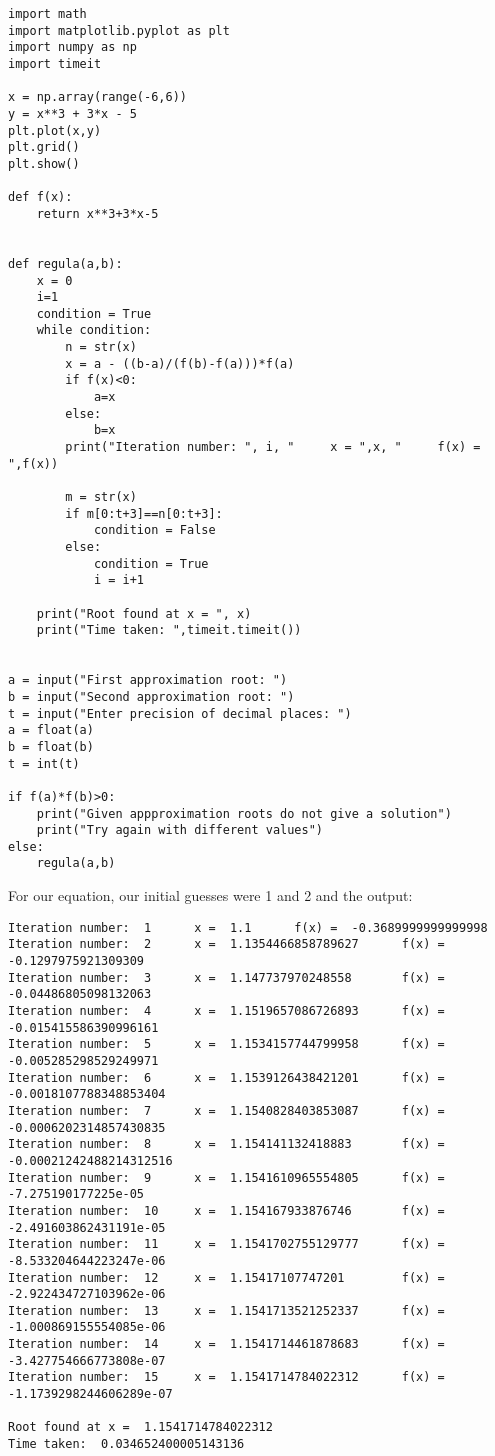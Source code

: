 \documentclass{article}
\begin{document}
\begin{verbatim}
import math
import matplotlib.pyplot as plt
import numpy as np
import timeit

x = np.array(range(-6,6))
y = x**3 + 3*x - 5
plt.plot(x,y)
plt.grid()
plt.show()

def f(x):
    return x**3+3*x-5


def regula(a,b):
    x = 0
    i=1
    condition = True
    while condition:
        n = str(x)
        x = a - ((b-a)/(f(b)-f(a)))*f(a)
        if f(x)<0:
            a=x
        else:
            b=x
        print("Iteration number: ", i, "     x = ",x, "     f(x) = ",f(x))

        m = str(x)
        if m[0:t+3]==n[0:t+3]:
            condition = False
        else:
            condition = True
            i = i+1
    
    print("Root found at x = ", x)
    print("Time taken: ",timeit.timeit())


a = input("First approximation root: ")
b = input("Second approximation root: ")
t = input("Enter precision of decimal places: ")
a = float(a)
b = float(b)
t = int(t)

if f(a)*f(b)>0:
    print("Given appproximation roots do not give a solution")
    print("Try again with different values")
else:
    regula(a,b)
\end{verbatim}

For our equation, our initial guesses were 1 and 2 and the output:
\begin{verbatim}
Iteration number:  1      x =  1.1      f(x) =  -0.3689999999999998
Iteration number:  2      x =  1.1354466858789627      f(x) =  -0.1297975921309309
Iteration number:  3      x =  1.147737970248558       f(x) =  -0.04486805098132063
Iteration number:  4      x =  1.1519657086726893      f(x) =  -0.015415586390996161
Iteration number:  5      x =  1.1534157744799958      f(x) =  -0.005285298529249971
Iteration number:  6      x =  1.1539126438421201      f(x) =  -0.0018107788348853404
Iteration number:  7      x =  1.1540828403853087      f(x) =  -0.0006202314857430835
Iteration number:  8      x =  1.154141132418883       f(x) =  -0.00021242488214312516
Iteration number:  9      x =  1.1541610965554805      f(x) =  -7.275190177225e-05
Iteration number:  10     x =  1.154167933876746       f(x) =  -2.491603862431191e-05
Iteration number:  11     x =  1.1541702755129777      f(x) =  -8.533204644223247e-06
Iteration number:  12     x =  1.15417107747201        f(x) =  -2.922434727103962e-06
Iteration number:  13     x =  1.1541713521252337      f(x) =  -1.000869155554085e-06
Iteration number:  14     x =  1.1541714461878683      f(x) =  -3.427754666773808e-07
Iteration number:  15     x =  1.1541714784022312      f(x) =  -1.1739298244606289e-07

Root found at x =  1.1541714784022312
Time taken:  0.034652400005143136
\end{verbatim}
\end{document}
